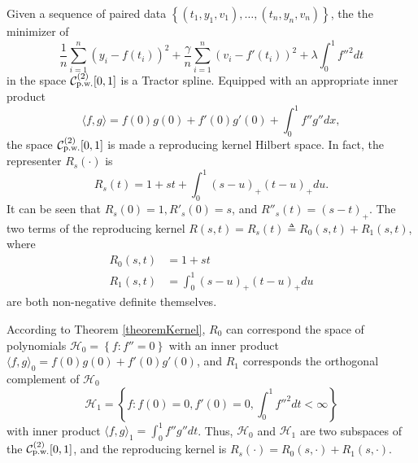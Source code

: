 Given a sequence of paired data $\left\lbrace (t_1,y_1,v_1),\ldots, (t_n,y_n,v_n) \right\rbrace$, the the minimizer of 
\begin{equation}\label{maineq}
\frac{1}{n}\sum_{i=1}^{n}(y_i-f(t_i))^2+\frac{\gamma}{n}\sum_{i=1}^{n}(v_i-f'(t_i))^2+\lambda \int_{0}^{1}f''^2dt
\end{equation}
in the space $\mathcal{C}_{\mbox{\scriptsize p.w.}}^{(2)}[0,1]$ is a Tractor spline. Equipped with an appropriate inner product
\begin{equation}\label{TractorSplineInnerProduct}
\langle f,g \rangle=f(0) g(0)+f'(0) g'(0)+\int_{0}^{1}f''g''dx,
\end{equation}
the space $\mathcal{C}_{\mbox{\scriptsize p.w.}}^{(2)}[0,1]$ is made a reproducing kernel Hilbert space. In fact, the representer $R_s(\cdot)$ is 
\begin{equation}\label{kerneleq}
R_s(t)=1+st+\int_{0}^{1} (s-u)_+(t-u)_+du.
\end{equation}
It can be seen that $R_s(0)=1, R'_s(0)=s$, and $R''_s(t)=(s-t)_+$. The two terms of the reproducing kernel $R(s,t)=R_s(t)\triangleq R_0(s,t)+R_1(s,t)$, where
\begin{align*} %
R_0(s,t)&=1+st \\ %
R_1(s,t)&=\int_{0}^{1} (s-u)_+(t-u)_+du
\end{align*}
are both non-negative definite themselves.


According to Theorem \ref{theoremKernel}, $R_0$ can correspond the space of polynomials $\mathcal{H}_0=\left\lbrace f:f''=0\right\rbrace$ with an inner product $\langle f,g \rangle_0= f(0)g(0)+f'(0)g'(0)$, and $R_1$ corresponds the orthogonal complement of $\mathcal{H}_0$
\begin{equation*}
\mathcal{H}_1=\left\lbrace f:f(0)=0, f'(0)=0, \int_{0}^{1}f''^2dt<\infty\right\rbrace
\end{equation*}
with inner product $\langle f,g \rangle_1=\int_{0}^{1}f''g''dt$. Thus, $\mathcal{H}_0$ and $\mathcal{H}_1$ are two subspaces of the $\mathcal{C}_{\mbox{\scriptsize p.w.}}^{(2)}[0,1]$, and the reproducing kernel is $R_s(\cdot) = R_0(s,\cdot)+R_1(s,\cdot)$.


